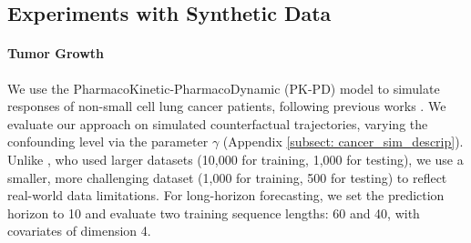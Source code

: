 \documentclass{article}
\theoremstyle{plain}
\theoremstyle{definition}
\theoremstyle{remark}
\begin{document}
\subsection{Experiments with Synthetic Data}
\paragraph{Tumor Growth} 
We use the PharmacoKinetic-PharmacoDynamic (PK-PD) model \cite{PK-PD} to simulate responses of non-small cell lung cancer patients, following previous works \citep{lim2018RMSM, bica2020estimatingCRN, Melnychuk2022CausalTF}. We evaluate our approach on simulated counterfactual trajectories, varying the confounding level via the parameter \( \gamma \) (Appendix \ref{subsect: cancer_sim_descrip}). Unlike \cite{Melnychuk2022CausalTF}, who used larger datasets (10,000 for training, 1,000 for testing), we use a smaller, more challenging dataset (1,000 for training, 500 for testing) to reflect real-world data limitations. For long-horizon forecasting, we set the prediction horizon to 10 and evaluate two training sequence lengths: 60 and 40, with covariates of dimension 4.
\setlength{\textfloatsep}{5pt} %
\end{document}
